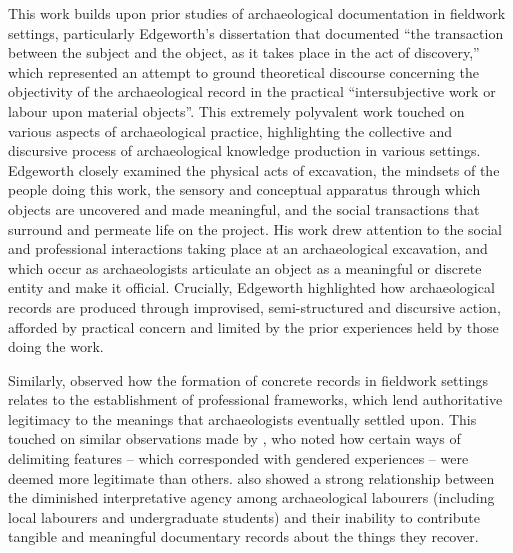 This work builds upon prior studies of archaeological documentation in fieldwork settings, particularly Edgeworth's \parencite*[28]{edgeworth1991} dissertation that documented ``the transaction between the subject and the object, as it takes place in the act of discovery,'' which represented an attempt to ground theoretical discourse concerning the objectivity of the archaeological record in the practical ``intersubjective work or labour upon material objects''.
This extremely polyvalent work touched on various aspects of archaeological practice, highlighting the collective and discursive process of archaeological knowledge production in various settings.
Edgeworth closely examined the physical acts of excavation, the mindsets of the people doing this work, the sensory and conceptual apparatus through which objects are uncovered and made meaningful, and the social transactions that surround and permeate life on the project.
His work drew attention to the social and professional interactions taking place at an archaeological excavation, and which occur as archaeologists articulate an object as a meaningful or discrete entity and make it official.
Crucially, Edgeworth highlighted how archaeological records are produced through improvised, semi-structured and discursive action, afforded by practical concern and limited by the prior experiences held by those doing the work.

Similarly, \textcites[]{goodwin1994}[]{goodwin2010} observed how the formation of concrete records in fieldwork settings relates to the establishment of professional frameworks, which lend authoritative legitimacy to the meanings that archaeologists eventually settled upon.
This touched on similar observations made by \textcite[]{gero1996}, who noted how certain ways of delimiting features -- which corresponded with gendered experiences -- were deemed more legitimate than others.
\textcites[]{mickel2021}[]{yarrow2008} also showed a strong relationship between the diminished interpretative agency among archaeological labourers (including local labourers and undergraduate students) and their inability to contribute tangible and meaningful documentary records about the things they recover.

